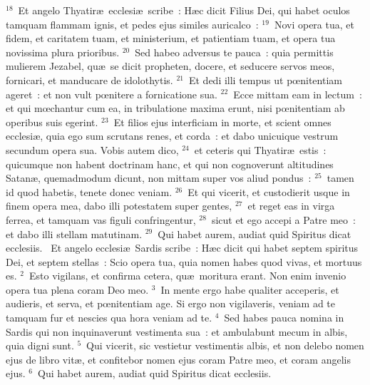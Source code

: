 ${}^{18}$~Et angelo Thyatir\ae\ ecclesi\ae\ scribe~: H\ae c dicit Filius Dei, qui habet oculos tamquam flammam ignis, et pedes ejus similes auricalco~:
${}^{19}$~Novi opera tua, et fidem, et caritatem tuam, et ministerium, et patientiam tuam, et opera tua novissima plura prioribus.
${}^{20}$~Sed habeo adversus te pauca~: quia permittis mulierem Jezabel, qu\ae\ se dicit propheten, docere, et seducere servos meos, fornicari, et manducare de idolothytis.
${}^{21}$~Et dedi illi tempus ut pœnitentiam ageret~: et non vult pœnitere a fornicatione sua.
${}^{22}$~Ecce mittam eam in lectum~: et qui mœchantur cum ea, in tribulatione maxima erunt, nisi pœnitentiam ab operibus suis egerint.
${}^{23}$~Et filios ejus interficiam in morte, et scient omnes ecclesi\ae , quia ego sum scrutans renes, et corda~: et dabo unicuique vestrum secundum opera sua. Vobis autem dico,
${}^{24}$~et ceteris qui Thyatir\ae\ estis~: quicumque non habent doctrinam hanc, et qui non cognoverunt altitudines Satan\ae , quemadmodum dicunt, non mittam super vos aliud pondus~:
${}^{25}$~tamen id quod habetis, tenete donec veniam.
${}^{26}$~Et qui vicerit, et custodierit usque in finem opera mea, dabo illi potestatem super gentes,
${}^{27}$~et reget eas in virga ferrea, et tamquam vas figuli confringentur,
${}^{28}$~sicut et ego accepi a Patre meo~: et dabo illi stellam matutinam.
${}^{29}$~Qui habet aurem, audiat quid Spiritus dicat ecclesiis.
~\lettrine[lines=10,image=true,loversize=0.05,lraise=-0.03]{E}{}t angelo ecclesi\ae\ Sardis scribe~: H\ae c dicit qui habet septem spiritus Dei, et septem stellas~: Scio opera tua, quia nomen habes quod vivas, et mortuus es.
${}^{2}$~Esto vigilans, et confirma cetera, qu\ae\ moritura erant. Non enim invenio opera tua plena coram Deo meo.
${}^{3}$~In mente ergo habe qualiter acceperis, et audieris, et serva, et pœnitentiam age. Si ergo non vigilaveris, veniam ad te tamquam fur et nescies qua hora veniam ad te.
${}^{4}$~Sed habes pauca nomina in Sardis qui non inquinaverunt vestimenta sua~: et ambulabunt mecum in albis, quia digni sunt.
${}^{5}$~Qui vicerit, sic vestietur vestimentis albis, et non delebo nomen ejus de libro vit\ae , et confitebor nomen ejus coram Patre meo, et coram angelis ejus.
${}^{6}$~Qui habet aurem, audiat quid Spiritus dicat ecclesiis.


